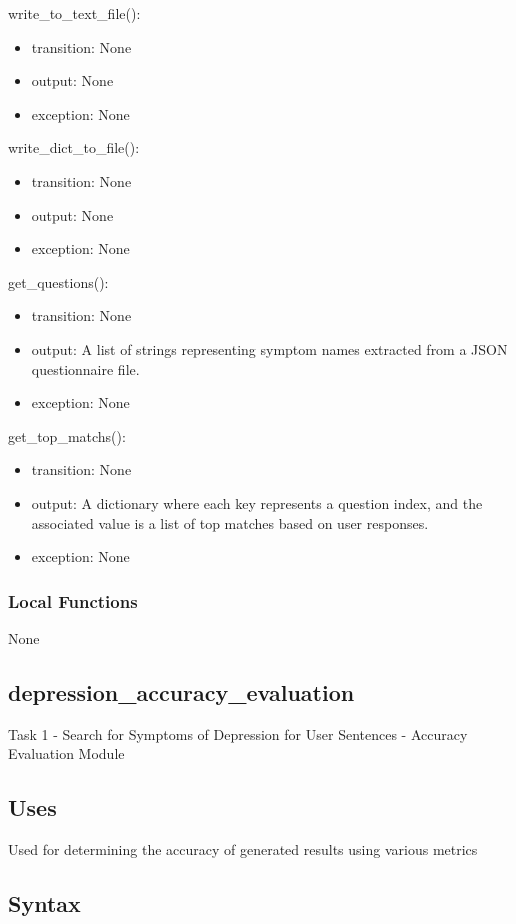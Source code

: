 \documentclass[12pt, titlepage]{article}
\begin{document}
\noindent write\_to\_text\_file():
\begin{itemize}
\item transition: None
\item output: None
\item exception: None
\end{itemize}
\noindent write\_dict\_to\_file():
\begin{itemize}
\item transition: None
\item output: None
\item exception: None
\end{itemize}
\noindent get\_questions():
\begin{itemize}
\item transition: None
\item output: A list of strings representing symptom names extracted from a JSON questionnaire file.
\item exception: None
\end{itemize}
\noindent get\_top\_matchs():
\begin{itemize}
\item transition: None
\item output: A dictionary where each key represents a question index, and the associated value is a list of top matches based on user responses.
\item exception: None
\end{itemize}

\subsubsection{Local Functions}

None

\subsection{depression\_accuracy\_evaluation}

Task 1 - Search for Symptoms of Depression for User Sentences - Accuracy Evaluation Module


\subsection{Uses}

Used for determining the accuracy of generated results using various metrics

\subsection{Syntax}
\end{document}
